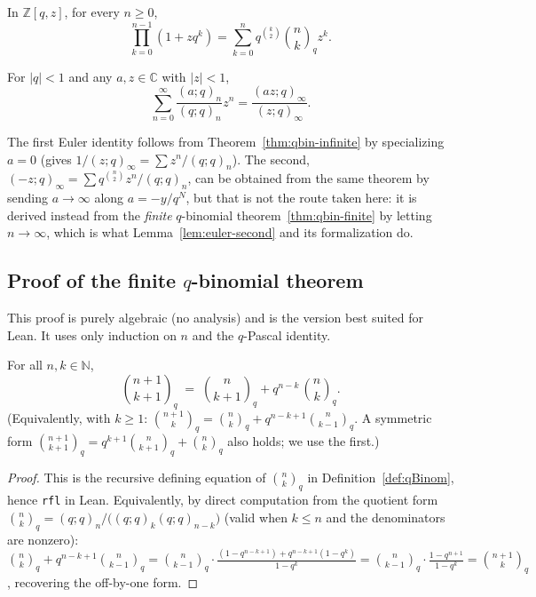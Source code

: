 \begin{theorem}\label{thm:qbin-finite}\leanok{}
In $\mathbb{Z}[q, z]$, for every $n \geq 0$,
\[
\prod_{k=0}^{n-1} (1 + z q^k) = \sum_{k=0}^n q^{\binom{k}{2}} \binom{n}{k}_q z^k.
\]
\end{theorem}

\begin{theorem}\label{thm:qbin-infinite}\leanok{}
For $|q| < 1$ and any $a, z \in \mathbb{C}$ with $|z| < 1$,
\[
\sum_{n=0}^\infty \frac{(a; q)_n}{(q; q)_n} z^n = \frac{(a z; q)_\infty}{(z; q)_\infty}.
\]
\end{theorem}

The first Euler identity follows from Theorem~\ref{thm:qbin-infinite} by specializing $a = 0$ (gives $1/(z;q)_\infty = \sum z^n / (q;q)_n$). The second, $(-z;q)_\infty = \sum q^{\binom{n}{2}} z^n / (q;q)_n$, can be obtained from the same theorem by sending $a \to \infty$ along $a = -y/q^N$, but that is not the route taken here: it is derived instead from the \emph{finite} $q$-binomial theorem~\ref{thm:qbin-finite} by letting $n \to \infty$, which is what Lemma~\ref{lem:euler-second} and its formalization do.

\subsection{Proof of the finite $q$-binomial theorem}

This proof is purely algebraic (no analysis) and is the version best suited for Lean. It uses only induction on $n$ and the $q$-Pascal identity.

\begin{lemma}[$q$-Pascal]\label{lem:qpascal}\leanok{}
For all $n, k \in \mathbb{N}$,
\[
  \binom{n+1}{k+1}_q \;=\; \binom{n}{k+1}_q + q^{n - k}\,\binom{n}{k}_q.
\]
(Equivalently, with $k \geq 1$:
$\binom{n+1}{k}_q = \binom{n}{k}_q + q^{n - k + 1}\binom{n}{k-1}_q$.
A symmetric form $\binom{n+1}{k+1}_q = q^{k+1}\binom{n}{k+1}_q + \binom{n}{k}_q$
also holds; we use the first.)
\end{lemma}

\begin{proof}\leanok
This is the recursive defining equation of $\binom{n}{k}_q$ in
Definition~\ref{def:qBinom}, hence \texttt{rfl} in Lean. Equivalently, by
direct computation from the quotient form
$\binom{n}{k}_q = (q;q)_n / \bigl((q;q)_k(q;q)_{n-k}\bigr)$
(valid when $k \leq n$ and the denominators are nonzero):
$\binom{n}{k}_q + q^{n-k+1}\binom{n}{k-1}_q
  = \binom{n}{k-1}_q \cdot \tfrac{(1 - q^{n-k+1}) + q^{n-k+1}(1 - q^k)}{1 - q^k}
  = \binom{n}{k-1}_q \cdot \tfrac{1 - q^{n+1}}{1 - q^k}
  = \binom{n+1}{k}_q$,
recovering the off-by-one form.
\end{proof}

